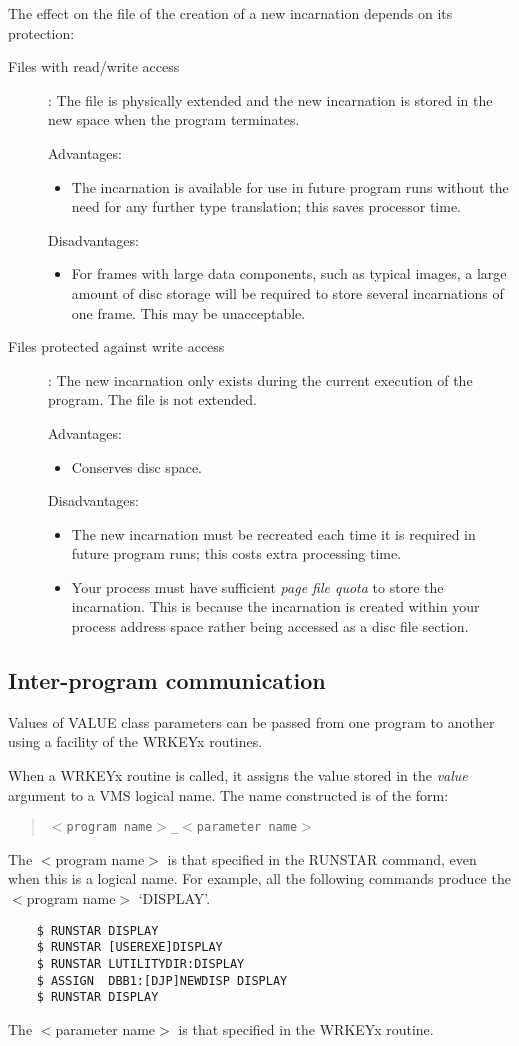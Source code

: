 \documentclass{article}
\begin{document}
The effect on the file of the creation of a new incarnation depends on its
protection:
\begin{description}
\item [Files with read/write access]:
The file is physically extended and the new incarnation is stored in the
new space when the program terminates.

Advantages:
\begin{itemize}
\item The incarnation is available for use in future program runs without the need
for any further type translation; this saves processor time.
\end{itemize}
Disadvantages:
\begin{itemize}
\item For frames with large data components, such as typical images, a large
amount of disc storage will be required to store several incarnations of one
frame.
This may be unacceptable.
\end{itemize}
\item [Files protected against write access]:
The new incarnation only exists during the current execution of the program.
The file is not extended.

Advantages:
\begin{itemize}
\item Conserves disc space.
\end{itemize}
Disadvantages:
\begin{itemize}
\item The new incarnation must be recreated each time it is required in future
program runs; this costs extra processing time.
\item Your process must have sufficient {\em page file quota} to store the
incarnation.
This is because the incarnation is created within your process address space
rather being accessed as a disc file section.
\end{itemize}
\end{description}
\subsection {Inter-program communication}
Values of VALUE class parameters can be passed from one program to another
using a facility of the WRKEYx routines.

When a WRKEYx routine is called, it assigns the value stored in the {\em value}
argument to a VMS logical name.
The name constructed is of the form:
\begin{quote}
{\tt $<$program name$>$\_$<$parameter name$>$}
\end{quote}
The $<$program name$>$ is that specified in the RUNSTAR command, even when this
is a logical name.
For example, all the following commands produce the $<$program name$>$
`DISPLAY'.
\begin{verbatim}
    $ RUNSTAR DISPLAY
    $ RUNSTAR [USEREXE]DISPLAY
    $ RUNSTAR LUTILITYDIR:DISPLAY
    $ ASSIGN  DBB1:[DJP]NEWDISP DISPLAY
    $ RUNSTAR DISPLAY
\end{verbatim}
The $<$parameter name$>$ is that specified in the WRKEYx routine.
\end{document}
